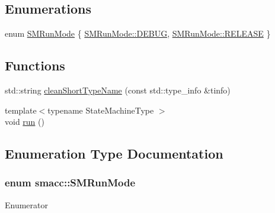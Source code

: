 \subsection*{Enumerations}
\begin{DoxyCompactItemize}
\item 
enum \hyperlink{namespacesmacc_a3e4f79486ea6ea6342dd3c712d16a4f6}{S\+M\+Run\+Mode} \{ \hyperlink{namespacesmacc_a3e4f79486ea6ea6342dd3c712d16a4f6adc30ec20708ef7b0f641ef78b7880a15}{S\+M\+Run\+Mode\+::\+D\+E\+B\+UG}, 
\hyperlink{namespacesmacc_a3e4f79486ea6ea6342dd3c712d16a4f6a7d649ef069df9885e382417c79f3d5cd}{S\+M\+Run\+Mode\+::\+R\+E\+L\+E\+A\+SE}
 \}
\end{DoxyCompactItemize}
\subsection*{Functions}
\begin{DoxyCompactItemize}
\item 
std\+::string \hyperlink{namespacesmacc_a09b297b1cdb9aae93a958f323431464a}{clean\+Short\+Type\+Name} (const std\+::type\+\_\+info \&tinfo)
\item 
{\footnotesize template$<$typename State\+Machine\+Type $>$ }\\void \hyperlink{namespacesmacc_a47ac3b8d2968b1ba4152afd64ab66bd0}{run} ()
\end{DoxyCompactItemize}


\subsection{Enumeration Type Documentation}
\subsubsection[{\texorpdfstring{S\+M\+Run\+Mode}{SMRunMode}}]{\setlength{\rightskip}{0pt plus 5cm}enum {\bf smacc\+::\+S\+M\+Run\+Mode}\hspace{0.3cm}{\ttfamily [strong]}}\hypertarget{namespacesmacc_a3e4f79486ea6ea6342dd3c712d16a4f6}{}\label{namespacesmacc_a3e4f79486ea6ea6342dd3c712d16a4f6}
\begin{Desc}
\item[Enumerator]\par
\begin{description}
\item[{\em 
D\+E\+B\+UG\hypertarget{namespacesmacc_a3e4f79486ea6ea6342dd3c712d16a4f6adc30ec20708ef7b0f641ef78b7880a15}{}\label{namespacesmacc_a3e4f79486ea6ea6342dd3c712d16a4f6adc30ec20708ef7b0f641ef78b7880a15}
}]\item[{\em 
R\+E\+L\+E\+A\+SE\hypertarget{namespacesmacc_a3e4f79486ea6ea6342dd3c712d16a4f6a7d649ef069df9885e382417c79f3d5cd}{}\label{namespacesmacc_a3e4f79486ea6ea6342dd3c712d16a4f6a7d649ef069df9885e382417c79f3d5cd}
}]\end{description}
\end{Desc}


